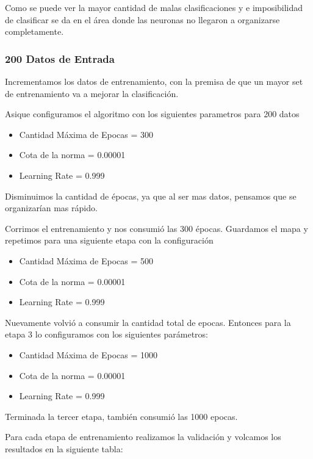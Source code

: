 Como se puede ver la mayor cantidad de malas clasificaciones y e imposibilidad
de clasificar se da en el área donde las neuronas no llegaron a organizarse completamente.


\subsubsection{200 Datos de Entrada}

Incrementamos los datos de entrenamiento, con la premisa de que un mayor set de entrenamiento
va a mejorar la clasificación.

Asique configuramos el algoritmo con los siguientes parametros para 200 datos


\begin{itemize}
	\item Cantidad Máxima de Epocas = 300
	\item Cota de la norma = 0.00001
	\item Learning Rate = 0.999
\end{itemize}

Disminuimos la cantidad de épocas, ya que al ser mas datos, pensamos que se organizarían mas 
rápido.

Corrimos el entrenamiento y nos consumió las 300 épocas. Guardamos el mapa y repetimos para 
una siguiente etapa con la configuración

\begin{itemize}
	\item Cantidad Máxima de Epocas = 500
	\item Cota de la norma = 0.00001
	\item Learning Rate = 0.999
\end{itemize}

Nuevamente volvió a consumir la cantidad total de epocas. Entonces para la etapa 3 lo
configuramos con los siguientes parámetros:

\begin{itemize}
	\item Cantidad Máxima de Epocas = 1000
	\item Cota de la norma = 0.00001
	\item Learning Rate = 0.999
\end{itemize}

Terminada la tercer etapa, también consumió las 1000 epocas.

Para cada etapa de entrenamiento realizamos la validación y volcamos los resultados
en la siguiente tabla:


